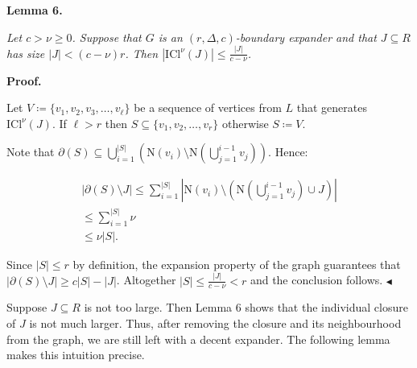 

\par\medskip\noindent\textbf{
\textbf{Lemma 6}\textbf{.}
}\par



\emph{Let $c>\nu\geq 0$. Suppose that $G$ is an $(r,\Delta,c)$-boundary expander and that $J\subseteq R$ has size $|J|<(c-\nu)r$. Then $|\mathrm{ICl}^{\nu}\left(J\right)|\leq\frac{|J|}{c-\nu}$.}\par







\par\medskip\noindent\textbf{Proof.}\par




Let $V\coloneqq\{v_{1},v_{2},v_{3},\dots,v_{\ell}\}$ be a sequence of vertices from $L$ that
generates $\mathrm{ICl}^{\nu}\left(J\right)$. If $\ell>r$ then $S\subseteq\{v_{1},v_{2},\dots,v_{r}\}$ otherwise $S\coloneqq V$.\par




Note that $\partial(S)\subseteq\bigcup\limits_{i=1}^{|S|}(\mathrm{N}\left(v_{i}\right)%
\setminus\mathrm{N}\left(\bigcup\limits_{j=1}^{i-1}v_{j}\right))$. Hence:\par


\[\begin{gathered}
\displaystyle|\partial(S)\setminus J| \displaystyle\leq\sum\limits_{i=1}^{|S|}|\mathrm{N}\left(v_{i}\right)\setminus%
(\mathrm{N}\left(\bigcup\limits_{j=1}^{i-1}v_{j}\right)\cup J)| \\
\displaystyle\leq\sum\limits_{i=1}^{|S|}\nu \\
\displaystyle\leq\nu|S|.
\end{gathered}\]




Since $|S|\leq r$ by definition, the expansion property of the graph guarantees that $|\partial(S)\setminus J|\geq c|S|-|J|$. Altogether $|S|\leq\frac{|J|}{c-\nu}<r$ and the conclusion
follows.
$\blacktriangleleft$\par




Suppose $J\subseteq R$ is not too large. Then Lemma 6 shows that the individual
closure of $J$ is not much larger. Thus, after removing the closure and its neighbourhood from the graph,
we are still left with a decent expander. The following lemma makes this intuition precise.\par



